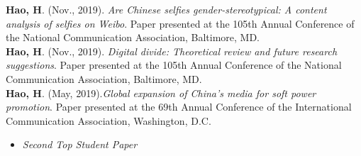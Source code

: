 
\begin{rSection}{}
\textbf{Hao, H}. (Nov., 2019). \textit{Are Chinese selfies gender-stereotypical: A content analysis of selfies on Weibo}. Paper presented at the 105th Annual Conference of the National Communication Association, Baltimore, MD. \\[3pt]
\textbf{Hao, H}. (Nov., 2019). \textit{Digital divide: Theoretical review and future research suggestions}. Paper presented at the 105th Annual Conference of the National Communication Association, Baltimore, MD. \\[3pt]
\textbf{Hao, H}. (May, 2019).\textit{Global expansion of China’s media for soft power promotion}. Paper presented at the 69th Annual Conference of the International Communication Association, Washington, D.C. 
\begin{itemize}
  \item[] \vspace{-0.5em} \faTrophy \hspace{0.5em} \emph{Second Top Student Paper}
\end{itemize}

\end{rSection}